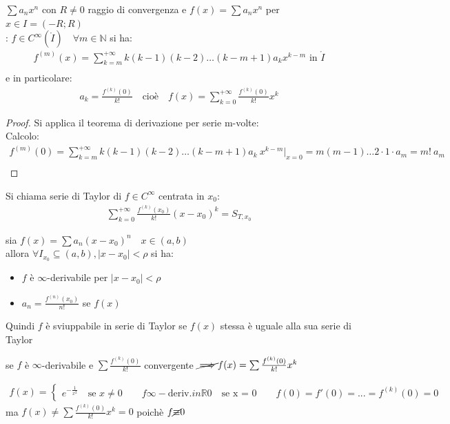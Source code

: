 \documentclass[a4paper, oneside]{article}
\begin{document}
\begin{theorem}
  $\sum a_n x^n$ con $R\neq 0$ raggio di convergenza e $f(x) = \sum a_n x^n$ per $x \in I = (-R;R)$\\
  : $f \in C^\infty (\mathring{I}) \quad \forall m \in \mathbb{N}$ si ha:\\
  \begin{gather*}
    f^{(m)} (x) = \sum_{k=m}^{+\infty} k(k-1)(k-2) \dots (k - m + 1) a_k x^{k-m} \text{ in } \mathring{I}\\
  \end{gather*}
  e in particolare:
  \begin{gather*}
    a_k = \frac{f^{(k)}(0)}{k!} \quad \text{cioè} \quad f(x) = \sum_{k=0}^{+\infty} \frac{f^{(k)}(0)}{k!} x^k 
  \end{gather*}
\end{theorem}
\begin{proof}
  Si applica il teorema di derivazione per serie m-volte:\\
  Calcolo:
  \begin{gather*}
    f^{(m)}(0) = \sum_{k=m}^{+\infty} k(k-1)(k-2) \dots (k - m + 1) a_k \ x^{k-m} \Bigg\rvert_{x=0} = m(m-1) \dots 2 \cdot 1 \cdot a_m = m! \ a_m \\
  \end{gather*}
\end{proof}
\begin{definition}
  Si chiama serie di Taylor di $f \in C^\infty$ centrata in $x_0$:
  \begin{gather*}
    \sum_{k=0}^{+\infty} \frac{f^{(k)}(x_0)}{k!} (x-x_0)^k = S_{T,x_0}
  \end{gather*} 
\end{definition}
\begin{observation}
  sia $f(x) = \sum a_n (x-x_0)^n \quad x \in (a,b)$\\
  allora $\forall I_{x_0} \subseteq (a,b) , |x-x_0| < \rho$ si ha:
  \begin{itemize}
    \item $f$ è $\infty$-derivabile per $|x-x_0| < \rho$
    \item $a_n = \frac{f^{(n)}(x_0)}{n!}$ se $f(x)$
  \end{itemize}
  Quindi $f$ è sviuppabile in serie di Taylor se $f(x)$ stessa è uguale alla sua serie di Taylor
\end{observation}
\begin{observation}
  se $f$ è $\infty$-derivabile e $\sum \frac{f^{(k)}(0)}{k!}$ convergente $\cancel{\implies} f(x) = \sum \frac{f^{(k)}(0)}{k!} x^k$\\
  \begin{example}
    \begin{gather*}
      f(x) = \begin{cases}
        e^{-\frac{1}{x^2}} \quad \text{se } x \neq 0 \qquad f \infty-\text{deriv.} in \mathbb{R} 
        0 \quad \text{se x = 0} \qquad f(0) = f'(0) = ... = f^{(k)}(0) = 0
      \end{cases}
    \end{gather*}
    ma $f(x) \neq \sum \frac{f^{(k)}(0)}{k!} x^k = 0$ poichè $f \cancel{\equiv} 0$
  \end{example}
\end{observation}
\end{document}
